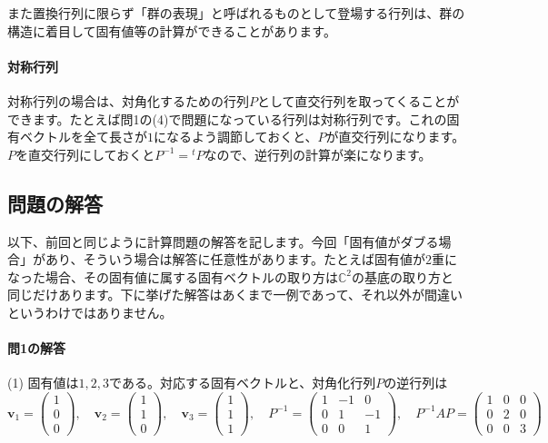 また置換行列に限らず「群の表現」と呼ばれるものとして登場する行列は、群の構造に着目して固有値等の計算ができることがあります。

\paragraph{対称行列}

対称行列の場合は、対角化するための行列$P$として直交行列を取ってくることができます。たとえば問1の(4)で問題になっている行列は対称行列です。これの固有ベクトルを全て長さが$1$になるよう調節しておくと、$P$が直交行列になります。$P$を直交行列にしておくと$P^{-1} = {}^tP$なので、逆行列の計算が楽になります。

\subsection{問題の解答}

以下、前回と同じように計算問題の解答を記します。今回「固有値がダブる場合」があり、そういう場合は解答に任意性があります。たとえば固有値が$2$重になった場合、その固有値に属する固有ベクトルの取り方は$\mathbb{C}^2$の基底の取り方と同じだけあります。下に挙げた解答はあくまで一例であって、それ以外が間違いというわけではありません。

\paragraph{問1の解答}

(1) 固有値は$1, 2, 3$である。対応する固有ベクトルと、対角化行列$P$の逆行列は
\[
\bm{v}_1 = 
\begin{pmatrix}
1 \\
0 \\
0
\end{pmatrix}, \quad
\bm{v}_2 = 
\begin{pmatrix}
1 \\
1 \\
0
\end{pmatrix}, \quad
\bm{v}_3 = 
\begin{pmatrix}
1 \\
1 \\
1
\end{pmatrix}, \quad
P^{-1} = 
\begin{pmatrix}
1 & -1 & 0 \\
0 & 1 & -1 \\
0 & 0 & 1
\end{pmatrix}, \quad
P^{-1} AP =
\begin{pmatrix}
1 & 0 & 0 \\
0 & 2 & 0 \\
0 & 0 & 3
\end{pmatrix}
\]

